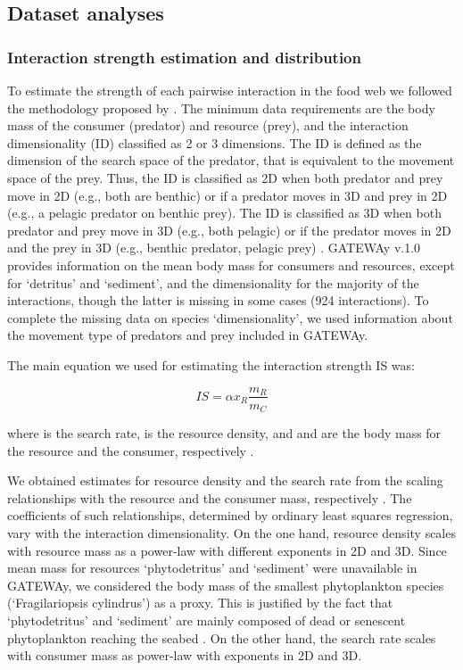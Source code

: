 \documentclass[gc, manuscript]{copernicus}
\begin{document}
\subsection{Dataset analyses}

\subsubsection{Interaction strength estimation and distribution}

To estimate the strength of each pairwise interaction in the food web we
followed the methodology proposed by \citet{Pawar2012}. The minimum data
requirements are the body mass of the consumer (predator) and resource
(prey), and the interaction dimensionality (ID) classified as 2 or 3
dimensions. The ID is defined as the dimension of the search space of
the predator, that is equivalent to the movement space of the prey.
Thus, the ID is classified as 2D when both predator and prey move in 2D
(e.g., both are benthic) or if a predator moves in 3D and prey in 2D
(e.g., a pelagic predator on benthic prey). The ID is classified as 3D
when both predator and prey move in 3D (e.g., both pelagic) or if the
predator moves in 2D and the prey in 3D (e.g., benthic predator, pelagic
prey) \citep{Pawar2012}. GATEWAy v.1.0 provides information on the mean
body mass for consumers and resources, except for `detritus' and
`sediment', and the dimensionality for the majority of the interactions,
though the latter is missing in some cases (924 interactions). To
complete the missing data on species `dimensionality', we used
information about the movement type of predators and prey included in
GATEWAy.

The main equation we used for estimating the interaction strength IS
was:

\begin{equation}
IS = \alpha x_R \frac{m_R}{m_C}
\end{equation}

where \vec{\alpha} is the search rate,  is the resource
density, and  and  are the body mass for the resource
and the consumer, respectively \citep{Pawar2012}.

We obtained estimates for resource density and the search rate from the
scaling relationships with the resource and the consumer mass,
respectively \citep{Pawar2012}. The coefficients of such relationships,
determined by ordinary least squares regression, vary with the
interaction dimensionality. On the one hand, resource density scales
with resource mass as a power-law with different exponents in 2D and 3D.
Since mean mass for resources `phytodetritus' and `sediment' were
unavailable in GATEWAy, we considered the body mass of the smallest
phytoplankton species (`Fragilariopsis cylindrus') as a proxy. This is
justified by the fact that `phytodetritus' and `sediment' are mainly
composed of dead or senescent phytoplankton reaching the seabed
\citep{Wolanski2011}. On the other hand, the search rate scales with
consumer mass as power-law with exponents in 2D and 3D.
\end{document}
